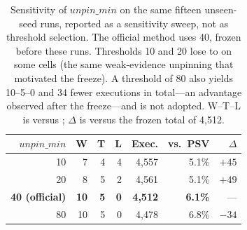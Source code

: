 \begin{table}[t]
\centering
\caption{Sensitivity of $\mathit{unpin\_min}$ on the same fifteen unseen-seed runs, reported as a sensitivity sweep, not as threshold selection. The official method uses 40, frozen before these runs. Thresholds 10 and 20 lose to  on some cells (the same weak-evidence unpinning that motivated the freeze). A threshold of 80 also yields 10--5--0 and 34 fewer executions in total---an advantage observed after the freeze---and is not adopted. W--T--L is versus ; $\Delta$ is versus the frozen total of 4{,}512.}
\label{tab:sens}
\footnotesize
\setlength{\tabcolsep}{3.4pt}
\begin{tabular}{@{}rrrrrrr@{}}
\toprule
$\mathit{unpin\_min}$ & W & T & L & Exec. & vs.\ PSV & $\Delta$\\
\midrule
10 & 7 & 4 & 4 & 4{,}557 & 5.1\% & $+45$\\
20 & 8 & 5 & 2 & 4{,}561 & 5.1\% & $+49$\\
\textbf{40 (official)} & \textbf{10} & \textbf{5} & \textbf{0} & \textbf{4{,}512} & \textbf{6.1\%} & ---\\
80 & 10 & 5 & 0 & 4{,}478 & 6.8\% & $-34$\\
\bottomrule
\end{tabular}
\end{table}
